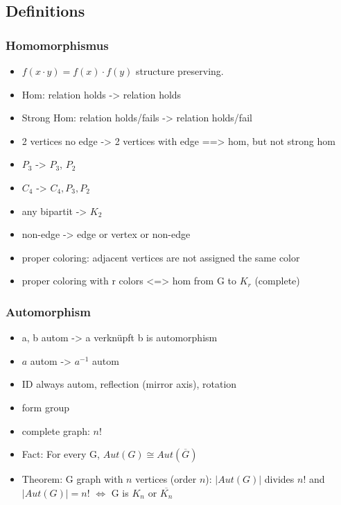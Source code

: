 \subsection{Definitions}

\subsubsection{Homomorphismus}

\begin{itemize}
    \item $f(x \cdot y) = f(x)\cdot f(y)$ structure preserving.
    \item Hom: relation holds -> relation holds
    \item Strong Hom: relation holds/fails -> relation holds/fail
    \item 2 vertices no edge -> 2 vertices with edge ==> hom, but not strong hom
    \item $P_3$ -> $P_3$, $P_2$
    \item $C_4$ -> $C_4, P_3, P_2$
    \item any bipartit -> $K_2$
    \item non-edge -> edge or vertex or non-edge
    \item proper coloring: adjacent vertices are not assigned the same color
    \item proper coloring with r colors <=> hom from G to $K_r$ (complete)
\end{itemize}

\subsubsection{Automorphism}
\begin{itemize}
    \item a, b autom -> a verknüpft b is automorphism
    \item $a$ autom -> $a^{-1}$ autom
    \item ID always autom, reflection (mirror axis), rotation
    \item form group
    \item complete graph: $n!$
    \item Fact: For every G, $Aut(G)\cong Aut(\overline{G})$
    \item Theorem: G graph with $n$ vertices (order $n$): $|Aut(G)|$ divides $n!$ and $|Aut(G)|=n!$ $\Longleftrightarrow$ G is $K_n$ or $\overline{K_n}$
\end{itemize}

